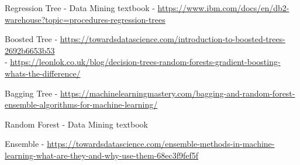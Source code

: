 \documentclass[
  paper=a4,
  ,captions=tableheading
]{scrartcl}
\begin{document}
Regression Tree - Data Mining textbook -
\url{https://www.ibm.com/docs/en/db2-warehouse?topic=procedures-regression-trees}

Boosted Tree -
\url{https://towardsdatascience.com/introduction-to-boosted-trees-2692b6653b53}\\
-
\url{https://leonlok.co.uk/blog/decision-trees-random-forests-gradient-boosting-whats-the-difference/}

Bagging Tree -
\url{https://machinelearningmastery.com/bagging-and-random-forest-ensemble-algorithms-for-machine-learning/}

Random Forest - Data Mining textbook

Ensemble -
\url{https://towardsdatascience.com/ensemble-methods-in-machine-learning-what-are-they-and-why-use-them-68ec3f9fef5f}
\end{document}
